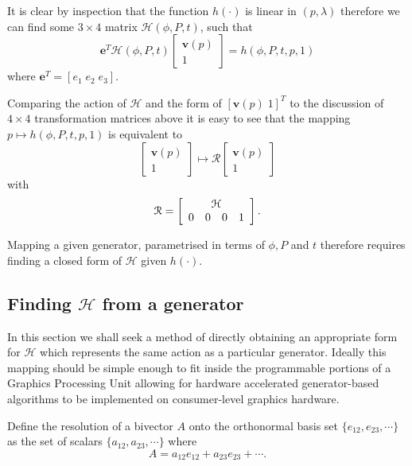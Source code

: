 It is clear by inspection that the function $h(\cdot)$ is linear in $(p,\lambda)$ 
therefore we can find some $3\times4$ matrix $\mathcal{H}(\phi, P, t)$, such that
\begin{equation}
\mathbf{e}^T 
 \mathcal{H}(\phi, P, t) \left[
\begin{array}{c}
\mathbf{v}(p) \\ 1
\end{array} 
\right] = h(\phi, P, t, p, 1) \label{eqn:hi}
\end{equation}
where $\mathbf{e}^T = \left[ e_1 \; e_2 \; e_3 \right]$.

Comparing the action of $\mathcal{H}$ and the form of $\left[ \mathbf{v}(p) \; 1 \right]^T$
to the discussion of $4\times4$ transformation matrices above it is easy to
see that the mapping $p \mapsto h(\phi, P, t, p, 1)$ is equivalent to
\[
\left[
\begin{array}{c}
\mathbf{v}(p) \\ 1
\end{array} 
\right]
\mapsto
\mathcal{R}
\left[
\begin{array}{c}
\mathbf{v}(p) \\ 1
\end{array} 
\right]
\]
with
\[
\mathcal{R} = \left[
\begin{array}{cccc}
\multicolumn{4}{c}{\mathcal{H}} \\
                 0 & 0 & 0 & 1 
\end{array}
\right].
\]

Mapping a given generator, parametrised in terms of $\phi, P$ and $t$ therefore
requires finding a closed form of $\mathcal{H}$ given $h(\cdot)$.

\subsection{Finding $\mathcal{H}$ from a generator}

In this section we shall seek a method of directly obtaining an appropriate
form for $\mathcal{H}$ which represents the same action as a particular
generator. Ideally this mapping should be simple enough to fit inside the
programmable portions of a Graphics Processing Unit allowing for hardware
accelerated generator-based algorithms to be implemented on consumer-level
graphics hardware.

\begin{definition}
Define the resolution of a bivector $A$ onto the orthonormal basis
set $\{e_{12}, e_{23}, \cdots\}$ as the set of scalars $\{a_{12}, a_{23}, \cdots\}$ where
\[A = a_{12}e_{12} + a_{23}e_{23} + \cdots.\]
\end{definition}

